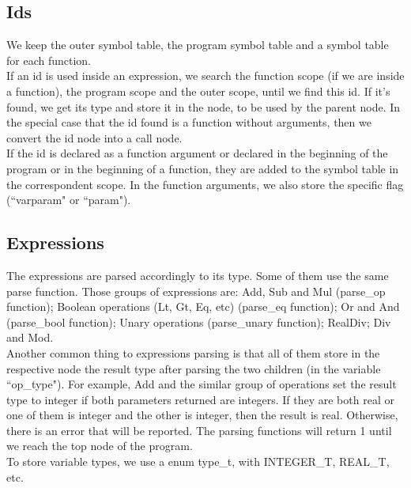 \documentclass[12pt]{article}
\begin{document}
\subsection{Ids}

We keep the outer symbol table, the program symbol table and a symbol table for each function. \\
If an id is used inside an expression, we search the function scope (if we are inside a function), the program scope and the outer scope, until we find this id. If it's found, we get its type and store it in the node, to be used by the parent node. In the special case that the id found is a function without arguments, then we convert the id node into a call node. \\
If the id is declared as a function argument or declared in the beginning of the program or in the beginning of a function, they are added to the symbol table in the correspondent scope. In the function arguments, we also store the specific flag (``varparam" or ``param").

\subsection{Expressions}

The expressions are parsed accordingly to its type. Some of them use the same parse function. Those groups of expressions are: Add, Sub and Mul (parse\_op function); Boolean operations (Lt, Gt, Eq, etc) (parse\_eq function); Or and And (parse\_bool function); Unary operations (parse\_unary function); RealDiv; Div and Mod.\\
Another common thing to expressions parsing is that all of them store in the respective node the result type after parsing the two children (in the variable ``op\_type"). For example, Add and the similar group of operations set the result type to integer if both parameters returned are integers. If they are both real or one of them is integer and the other is integer, then the result is real. Otherwise, there is an error that will be reported. The parsing functions will return 1 until we reach the top node of the program.\\
To store variable types, we use a enum type\_t, with INTEGER\_T, REAL\_T, etc.\\
\end{document}
